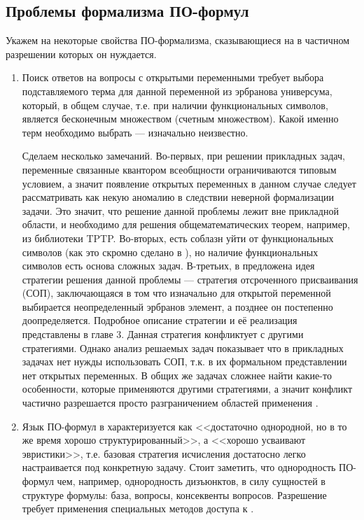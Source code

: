 \subsection{Проблемы формализма ПО-формул}
Укажем на некоторые свойства ПО-формализма, сказывающиеся на  в частичном разрешении которых он нуждается.

\begin{enumerate}

\item Поиск ответов на вопросы с открытыми переменными требует выбора   подставляемого терма для данной переменной из эрбранова универсума,   который, в общем случае, т.е. при наличии функциональных символов, является бесконечным множеством (счетным множеством). Какой именно терм необходимо выбрать --- изначально неизвестно.

Сделаем несколько замечаний. Во-первых, при решении прикладных задач, переменные связанные квантором всеобщности ограничиваются типовым условием, а значит появление открытых переменных в данном случае следует рассматривать как некую аномалию в следствии неверной формализации задачи. Это значит, что решение данной проблемы лежит вне прикладной области, и необходимо для решения общематематических теорем, например, из библиотеки TPTP.  Во-вторых, есть соблазн уйти от функциональных символов (как это скромно сделано в \cite{ICDS2000}), но наличие функциональных символов есть основа сложных задач. В-третьих, в \cite{ICDS2000} предложена идея стратегии решения данной проблемы --- стратегия отсроченного присваивания (СОП), заключающаяся в том что изначально для открытой переменной выбирается неопределенный эрбранов элемент, а позднее он постепенно доопределяется. Подробное описание стратегии и её реализация представлены в главе 3. Данная стратегия конфликтует с другими стратегиями. Однако анализ решаемых задач показывает что в  прикладных задачах нет нужды использовать СОП, т.к. в их формальном представлении нет открытых переменных. В общих же задачах сложнее найти какие-то особенности, которые применяются другими стратегиями, а значит конфликт частично разрешается просто разграничением областей применения .

\item Язык ПО-формул в \cite{ICDS2000} характеризуется как <<достаточно   однородной, но в то же время хорошо структурированный>>, а   <<хорошо усваивают эвристики>>, т.е. базовая стратегия исчисления достатосно легко настраивается под конкретную задачу. Стоит заметить, что однородность ПО-формул  чем, например, однородность дизъюнктов, в силу  сущностей в структуре формулы: база, вопросы, консеквенты вопросов. Разрешение  требует применения специальных методов доступа к .


\end{enumerate}
